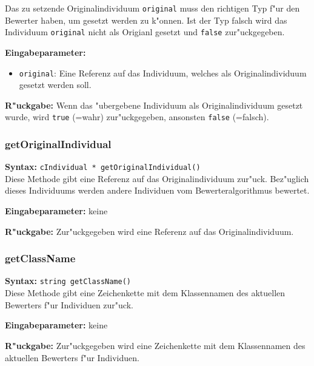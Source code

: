 Das zu setzende Originalindividuum \verb|original| muss den richtigen Typ f"ur den Bewerter haben, um gesetzt werden zu k"onnen. Ist der Typ falsch wird das Individuum \verb|original| nicht als Origianl gesetzt und \verb|false| zur"uckgegeben.

\bigskip\noindent
\textbf{Eingabeparameter:}
\begin{itemize}
 \item \verb|original|: Eine Referenz auf das Individuum, welches als Originalindividuum gesetzt werden soll.
\end{itemize}

\bigskip\noindent
\textbf{R"uckgabe:} Wenn das "ubergebene Individuum als Originalindividuum gesetzt wurde, wird \verb|true| (=wahr) zur"uckgegeben, ansonsten \verb|false| (=falsch).


\subsubsection{getOriginalIndividual}

\textbf{Syntax:} \verb|cIndividual * getOriginalIndividual()| \\

Diese Methode gibt eine Referenz auf das Originalindividuum zur"uck. Bez"uglich dieses Individuums werden andere Individuen vom Bewerteralgorithmus bewertet.

\bigskip\noindent
\textbf{Eingabeparameter:} keine

\bigskip\noindent
\textbf{R"uckgabe:} Zur"uckgegeben wird eine Referenz auf das Originalindividuum.


\subsubsection{getClassName}

\textbf{Syntax:} \verb|string getClassName()| \\

Diese Methode gibt eine Zeichenkette mit dem Klassennamen des aktuellen Bewerters f"ur Individuen zur"uck.

\bigskip\noindent
\textbf{Eingabeparameter:} keine

\bigskip\noindent
\textbf{R"uckgabe:} Zur"uckgegeben wird eine Zeichenkette mit dem Klassennamen des aktuellen Bewerters f"ur Individuen.


